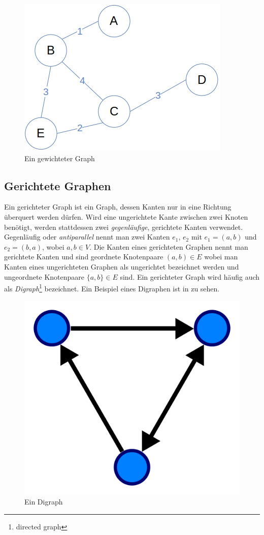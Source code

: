             \begin{figure}
                \centering
                \includegraphics[width=0.5\linewidth]{images/weighted.jpg}
                \caption{Ein gewichteter Graph\\\cite{EZ:Web04}}
                \label{fig:weighted-graph}
            \end{figure}

        \subsection{Gerichtete Graphen} \label{gerichtete-graphen}

            Ein gerichteter Graph ist ein Graph, dessen Kanten nur in eine Richtung überquert werden dürfen. Wird eine ungerichtete Kante zwischen zwei Knoten benötigt, werden stattdessen zwei \emph{gegenläufige}, gerichtete Kanten verwendet. Gegenläufig oder \emph{antiparallel} nennt man zwei Kanten $e_1$, $e_2$ mit $e_1 = (a, b)$ und $e_2 = (b, a)$, wobei $a, b \in V$. Die Kanten eines gerichteten Graphen nennt man gerichtete Kanten und sind geordnete Knotenpaare $(a, b) \in E$ wobei man Kanten eines ungerichteten Graphen als ungerichtet bezeichnet werden und ungeordnete Knotenpaare $\{a, b\} \in E$ sind. Ein gerichteter Graph wird häufig auch als \emph{Digraph}\footnote{directed graph} bezeichnet. Ein Beispiel eines Digraphen ist in  zu sehen. \cite{EZ:Web20}

            \begin{figure}
                \centering
                \includegraphics[width=0.4\linewidth]{images/digraph.png}
                \caption{Ein Digraph\\\cite{EZ:Web20}}
                \label{fig:digraph}
            \end{figure}
        
